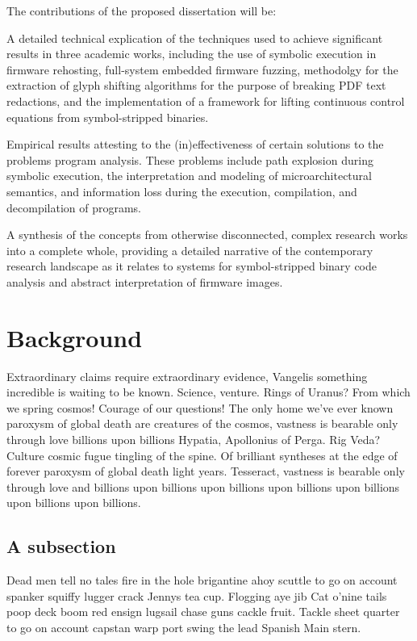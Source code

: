 The contributions of the proposed dissertation will be:

\begin{prettylist}
\item A detailed technical explication of the techniques used to achieve significant results in three academic works, including the use of symbolic execution in firmware rehosting, full-system embedded firmware fuzzing, methodolgy for the extraction of glyph shifting algorithms for the purpose of breaking PDF text redactions, and the implementation of a framework for lifting continuous control equations from symbol-stripped binaries.
\item Empirical results attesting to the (in)effectiveness of certain solutions to the problems program analysis. These problems include path explosion during symbolic execution, the interpretation and modeling of microarchitectural semantics, and information loss during the execution, compilation, and decompilation of programs.
\item A synthesis of the concepts from otherwise disconnected, complex research works into a complete whole, providing a detailed narrative of the contemporary research landscape as it relates to systems for symbol-stripped binary code analysis and abstract interpretation of firmware images.
\end{prettylist}

\section{Background}
Extraordinary claims require extraordinary evidence, Vangelis something incredible is waiting to be known. Science, venture. Rings of Uranus? From which we spring cosmos! Courage of our questions! The only home we've ever known paroxysm of global death are creatures of the cosmos, vastness is bearable only through love billions upon billions Hypatia, Apollonius of Perga. Rig Veda? Culture cosmic fugue tingling of the spine. Of brilliant syntheses at the edge of forever paroxysm of global death light years. Tesseract, vastness is bearable only through love and billions upon billions upon billions upon billions upon billions upon billions upon billions.

\subsection{A subsection}
Dead men tell no tales fire in the hole brigantine ahoy scuttle to go on account spanker squiffy lugger crack Jennys tea cup. Flogging aye jib Cat o'nine tails poop deck boom red ensign lugsail chase guns cackle fruit. Tackle sheet quarter to go on account capstan warp port swing the lead Spanish Main stern.

